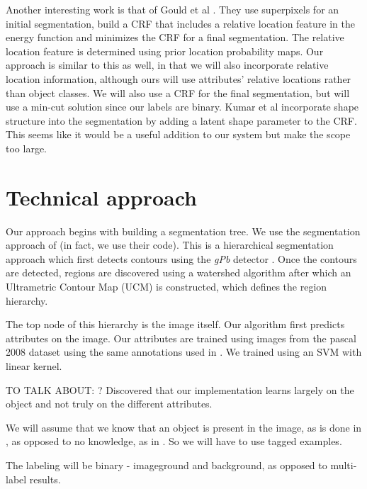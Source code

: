 \documentclass[10pt,twocolumn,letterpaper]{article}
\begin{document}
Another interesting work is that of Gould et al \cite{gould08}.  They use
superpixels for an initial segmentation, build a CRF that includes a
relative location feature in the energy function and minimizes the CRF
for a final segmentation.  The relative location feature is determined
using prior location probability maps.  Our approach is similar to this
as well, in that we will also incorporate relative location information,
although ours will use attributes' relative locations rather than object
classes.  We will also use a CRF for the final segmentation, but will
use a min-cut solution since our labels are binary.
Kumar et al \cite{kumar05} incorporate shape structure into the segmentation by
adding a latent shape parameter to the CRF.  This seems like it would be
a useful addition to our system but make the scope too large.

\section{Technical approach}
\label{sec:technical}
Our approach begins with building a segmentation tree.  We use the segmentation
approach of \cite{arbelaez09} (in fact, we use their code).  This is a hierarchical
segmentation approach which first detects contours using the \emph{gPb} detector
\cite{maire08}.  Once the contours are detected, regions are discovered using a
watershed algorithm after which an Ultrametric Contour Map (UCM) is constructed,
which defines the region hierarchy.

The top node of this hierarchy is the image itself.  Our algorithm first predicts
attributes on the image.  Our attributes are trained using images from the pascal 
2008 dataset using the same annotations used in \cite{farhadi09}.  We trained using
an SVM with linear kernel.

TO TALK ABOUT:
? Discovered that our implementation learns largely on the object and not truly
on the different attributes.

We will assume that we know that an object is present in the image, as is done in \cite{borenstein04}, as opposed to no knowledge, as in \cite{shotton06}.  So we will have to use tagged examples.

The labeling will be binary - imageground and background, as opposed to multi-label results.
\end{document}
